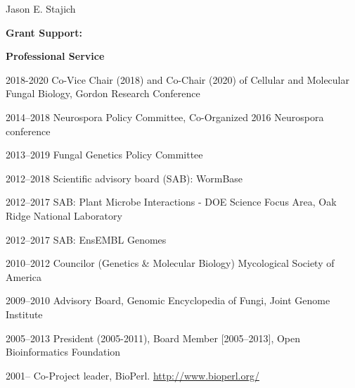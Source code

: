 \documentclass[10pt]{article}
\begin{document}
\begin{cv}{\centerline{Jason E. Stajich}}
\begin{cvlistcompact}{\bf Grant Support:}
\item [{\bf Professional Service}]
\item [2018-2020] Co-Vice Chair (2018) and Co-Chair (2020) of Cellular and Molecular Fungal Biology, Gordon Research Conference
\item [2014--2018] Neurospora Policy Committee, Co-Organized 2016 Neurospora conference
\item [2013--2019] Fungal Genetics Policy Committee
\item [2012--2018] Scientific advisory board (SAB): WormBase
\item [2012--2017] SAB: Plant Microbe Interactions - DOE Science Focus Area, Oak Ridge National Laboratory
\item [2012--2017] SAB: EnsEMBL Genomes
\item [2010--2012] Councilor (Genetics \& Molecular Biology) Mycological Society of America
\item [2009--2010] Advisory Board, Genomic Encyclopedia of Fungi, Joint Genome Institute
\item [2005--2013] President (2005-2011), Board Member [2005--2013], Open Bioinformatics Foundation
\item [2001--] Co-Project leader, BioPerl. \url{http://www.bioperl.org/}
\\

\end{cvlistcompact}



\end{cv}
\end{document}
